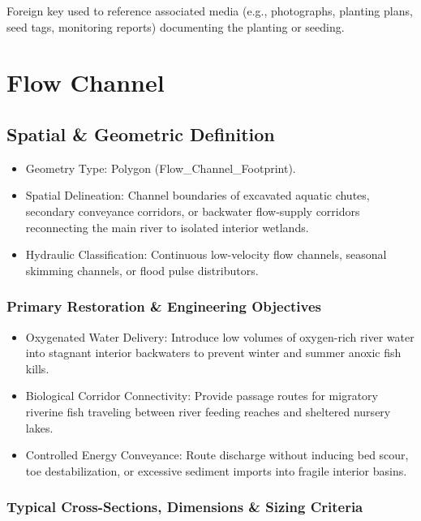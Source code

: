 \documentclass[
  letterpaper,
  DIV=11,
  numbers=noendperiod]{scrreprt}
\begin{document}
Foreign key used to reference associated media (e.g., photographs,
planting plans, seed tags, monitoring reports) documenting the planting
or seeding.

\chapter{Flow Channel}\label{flow-channel}

\section{Spatial \& Geometric
Definition}\label{spatial-geometric-definition-5}

\begin{itemize}
\item
  Geometry Type: Polygon (Flow\_Channel\_Footprint).
\item
  Spatial Delineation: Channel boundaries of excavated aquatic chutes,
  secondary conveyance corridors, or backwater flow-supply corridors
  reconnecting the main river to isolated interior wetlands.
\item
  Hydraulic Classification: Continuous low-velocity flow channels,
  seasonal skimming channels, or flood pulse distributors.
\end{itemize}

\subsection{Primary Restoration \& Engineering
Objectives}\label{primary-restoration-engineering-objectives-4}

\begin{itemize}
\item
  Oxygenated Water Delivery: Introduce low volumes of oxygen-rich river
  water into stagnant interior backwaters to prevent winter and summer
  anoxic fish kills.
\item
  Biological Corridor Connectivity: Provide passage routes for migratory
  riverine fish traveling between river feeding reaches and sheltered
  nursery lakes.
\item
  Controlled Energy Conveyance: Route discharge without inducing bed
  scour, toe destabilization, or excessive sediment imports into fragile
  interior basins.
\end{itemize}

\subsection{Typical Cross-Sections, Dimensions \& Sizing
Criteria}\label{typical-cross-sections-dimensions-sizing-criteria-4}
\end{document}
